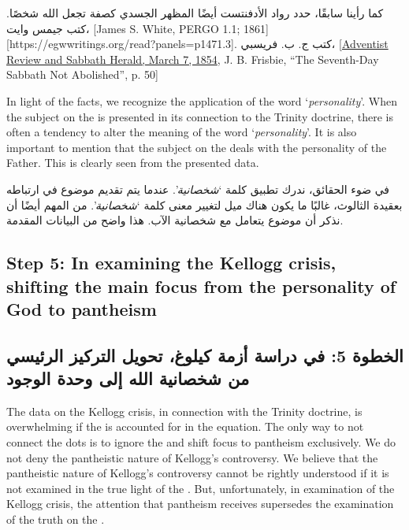 كما رأينا سابقًا، حدد رواد الأدفنتست أيضًا المظهر الجسدي كصفة تجعل الله شخصًا. كتب جيمس وايت، [James S. White, PERGO 1.1; 1861][https://egwwritings.org/read?panels=p1471.3]. كتب ج. ب. فريسبي، [\href{https://documents.adventistarchives.org/Periodicals/RH/RH18540307-V05-07.pdf}{Adventist Review and Sabbath Herald, March 7, 1854}, J. B. Frisbie, “The Seventh-Day Sabbath Not Abolished”, p. 50]


In light of the facts, we recognize the application of the word ‘\textit{personality}’. When the subject on the  is presented in its connection to the Trinity doctrine, there is often a tendency to alter the meaning of the word ‘\textit{personality}’. It is also important to mention that the subject on the  deals with the personality of the Father. This is clearly seen from the presented data.


في ضوء الحقائق، ندرك تطبيق كلمة ‘\textit{شخصانية}’. عندما يتم تقديم موضوع  في ارتباطه بعقيدة الثالوث، غالبًا ما يكون هناك ميل لتغيير معنى كلمة ‘\textit{شخصانية}’. من المهم أيضًا أن نذكر أن موضوع  يتعامل مع شخصانية الآب. هذا واضح من البيانات المقدمة.


\subsection*{Step 5: In examining the Kellogg crisis, shifting the main focus from the personality of God to pantheism}


\subsection*{الخطوة 5: في دراسة أزمة كيلوغ، تحويل التركيز الرئيسي من شخصانية الله إلى وحدة الوجود}


The data on the Kellogg crisis, in connection with the Trinity doctrine, is overwhelming if the  is accounted for in the equation. The only way to not connect the dots is to ignore the  and shift focus to pantheism exclusively. We do not deny the pantheistic nature of Kellogg's controversy. We believe that the pantheistic nature of Kellogg's controversy cannot be rightly understood if it is not examined in the true light of the . But, unfortunately, in examination of the Kellogg crisis, the attention that pantheism receives supersedes the examination of the truth on the .


